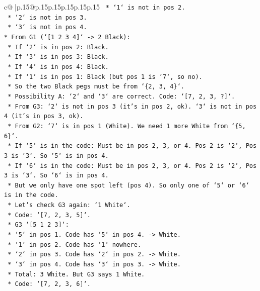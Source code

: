 \documentclass{article}
\begin{document}
{\begin{supertabular}{c@{$\;$}|p{.15\linewidth}@{}p{.15\linewidth}p{.15\linewidth}p{.15\linewidth}p{.15\linewidth}p{.15\linewidth}}
{{{\texttt{    *   `1` is not in pos 2.} \\
\texttt{    *   `2` is not in pos 3.} \\
\texttt{    *   `3` is not in pos 4.} \\
\texttt{*   From G1 (`{[}1 2 3 4{]}` {-}> 2 Black):} \\
\texttt{    *   If `2` is in pos 2: Black.} \\
\texttt{    *   If `3` is in pos 3: Black.} \\
\texttt{    *   If `4` is in pos 4: Black.} \\
\texttt{    *   If `1` is in pos 1: Black (but pos 1 is `7`, so no).} \\
\texttt{    *   So the two Black pegs must be from `\{2, 3, 4\}`.} \\
\texttt{    *   Possibility A: `2` and `3` are correct. Code: `{[}7, 2, 3, ?{]}`.} \\
\texttt{        *   From G3: `2` is not in pos 3 (it's in pos 2, ok). `3` is not in pos 4 (it's in pos 3, ok).} \\
\texttt{        *   From G2: `7` is in pos 1 (White). We need 1 more White from `\{5, 6\}`.} \\
\texttt{        *   If `5` is in the code: Must be in pos 2, 3, or 4. Pos 2 is `2`, Pos 3 is `3`. So `5` is in pos 4.} \\
\texttt{        *   If `6` is in the code: Must be in pos 2, 3, or 4. Pos 2 is `2`, Pos 3 is `3`. So `6` is in pos 4.} \\
\texttt{        *   But we only have one spot left (pos 4). So only one of `5` or `6` is in the code.} \\
\texttt{        *   Let's check G3 again: `1 White`.} \\
\texttt{            *   Code: `{[}7, 2, 3, 5{]}`.} \\
\texttt{            *   G3 `{[}5 1 2 3{]}`:} \\
\texttt{                *   `5` in pos 1. Code has `5` in pos 4. {-}> White.} \\
\texttt{                *   `1` in pos 2. Code has `1` nowhere.} \\
\texttt{                *   `2` in pos 3. Code has `2` in pos 2. {-}> White.} \\
\texttt{                *   `3` in pos 4. Code has `3` in pos 3. {-}> White.} \\
\texttt{                *   Total: 3 White. But G3 says 1 White.} \\
\texttt{            *   Code: `{[}7, 2, 3, 6{]}`.} \\
}}}
\end{supertabular}}
\end{document}
